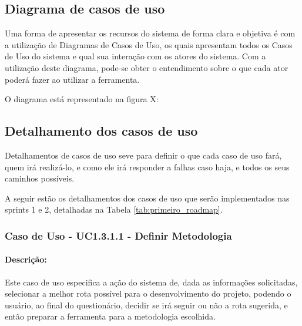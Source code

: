 \subsection{Diagrama de casos de uso}

Uma forma de apresentar os recursos do sistema de forma clara e objetiva é com a utilização de Diagramas de Casos de Uso, os quais apresentam todos os Casos de Uso do sistema e qual sua interação com os atores do sistema. Com a utilização deste diagrama, pode-se obter o entendimento sobre o que cada ator poderá fazer ao utilizar a ferramenta.

O diagrama está representado na figura X:

\subsection{Detalhamento dos casos de uso}

Detalhamentos de casos de uso seve para definir o que cada caso de uso fará, quem irá realizá-lo, e como ele irá responder a falhas caso haja, e todos os seus caminhos possíveis.

A seguir estão os detalhamentos dos casos de uso que serão implementados nas sprints 1 e 2, detalhadas na Tabela \ref{tab:primeiro_roadmap}.

\subsubsection{Caso de Uso - UC1.3.1.1 - Definir Metodologia}

\paragraph{Descrição:}

Este caso de uso especifica a ação do sistema de, dada as informações solicitadas, selecionar a melhor rota possível para o desenvolvimento do projeto, podendo o usuário, ao final do questionário, decidir se irá seguir ou não a rota sugerida, e então preparar a ferramenta para a metodologia escolhida.

